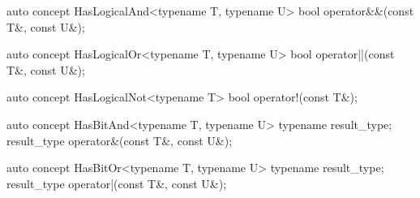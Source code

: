 \documentclass[american,twoside]{book}
\begin{document}
\begin{itemdescr}
\pnum
{}
\end{itemdescr}

\begin{itemdecl}
auto concept HasLogicalAnd<typename T, typename U> {
  bool operator&&(const T&, const U&);
}
\end{itemdecl}

\begin{itemdescr}
\pnum
{}
\end{itemdescr}

\begin{itemdecl}
auto concept HasLogicalOr<typename T, typename U> {
  bool operator||(const T&, const U&);
}
\end{itemdecl}

\begin{itemdescr}
\pnum
{}
\end{itemdescr}

\begin{itemdecl}
auto concept HasLogicalNot<typename T> {
  bool operator!(const T&);
}
\end{itemdecl}

\begin{itemdescr}
\pnum
{}
\end{itemdescr}

\begin{itemdecl}
auto concept HasBitAnd<typename T, typename U> {
  typename result_type;
  result_type operator&(const T&, const U&);
}
\end{itemdecl}

\begin{itemdescr}
\pnum
{}
\end{itemdescr}

\begin{itemdecl}
auto concept HasBitOr<typename T, typename U> {
  typename result_type;
  result_type operator|(const T&, const U&);
}
\end{itemdecl}

\begin{itemdescr}
\pnum
{}
\end{itemdescr}
\end{document}
